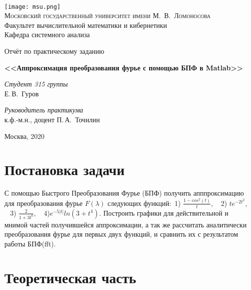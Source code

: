\documentclass[11pt]{article}
\begin{document}
\thispagestyle{empty}

\begin{center}
\ \vspace{-3cm}

\texttt{[image: msu.png]}\\
{\scshape Московский государственный университет имени М.~В.~Ломоносова}\\
Факультет вычислительной математики и кибернетики\\
Кафедра системного анализа

\vfill

{\LARGE Отчёт по практическому заданию}

\vspace{1cm}

{\Huge\bfseries <<Аппроксимация преобразования фурье с помощью БПФ в Matlab>>}
\end{center}

\vspace{1cm}

\begin{flushright}
  \large
  \textit{Студент 315 группы}\\
  Е.\,В.~Гуров

  \vspace{5mm}

  \textit{Руководитель практикума}\\
  к.ф.-м.н., доцент П.\,А.~Точилин
\end{flushright}

\vfill

\begin{center}
Москва, 2020
\end{center}
\newpage

\section{Постановка задачи}

С помощью Быстрого Преобразования Фурье (БПФ) получить апппроксимацию для преобразования фурье \(F(\lambda)\) следующих функций:~1) \( \frac{1 - cos^2(t)}{t} \), ~ 2) \( te^{-2t^2}\), ~ 3) \( \frac{2}{1 + 3t^6} \), ~ 4)\( e^{-5|t|}ln(3+t^4) \). Построить графики для действительной и мнимой частей получившейся аппроксимации, а так же рассчитать аналитически преобразования фурье для первых двух функций, и сравнить их с результатом работы БПФ(fft).

\section{Теоретическая часть}
\end{document}
